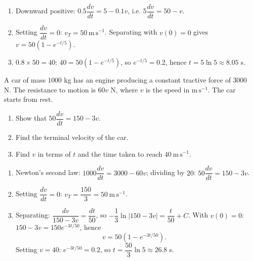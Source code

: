 \documentclass[11pt]{article}
\begin{document}
\begin{corrige}[Exercise 1]
\begin{enumerate}
\item Downward positive: $0.5\dfrac{dv}{dt} = 5 - 0.1v$, i.e. $5\dfrac{dv}{dt} = 50 - v$.
\item Setting $\dfrac{dv}{dt} = 0$: $v_T = 50\ \mathrm{m\,s^{-1}}$. Separating with $v(0) = 0$ gives $v = 50\left(1 - e^{-t/5}\right)$.
\item $0.8 \times 50 = 40$: $40 = 50(1 - e^{-t/5})$, so $e^{-t/5} = 0.2$, hence $t = 5\ln 5 \approx 8.05$ s.
\end{enumerate}
\end{corrige}

\begin{exercice}[]
A car of mass $1000$ kg has an engine producing a constant tractive force of $3000$ N. The resistance to motion is $60v$ N, where $v$ is the speed in $\mathrm{m\,s^{-1}}$. The car starts from rest.
\begin{enumerate}
\item Show that $50\dfrac{dv}{dt} = 150 - 3v$.
\item Find the terminal velocity of the car.
\item Find $v$ in terms of $t$ and the time taken to reach $40\ \mathrm{m\,s^{-1}}$.
\end{enumerate}
\end{exercice}

\begin{corrige}[Exercise 2]
\begin{enumerate}
\item Newton's second law: $1000\dfrac{dv}{dt} = 3000 - 60v$; dividing by $20$: $50\dfrac{dv}{dt} = 150 - 3v$.
\item Setting $\dfrac{dv}{dt} = 0$: $v_T = \dfrac{150}{3} = 50\ \mathrm{m\,s^{-1}}$.
\item Separating: $\dfrac{dv}{150 - 3v} = \dfrac{dt}{50}$, so $-\dfrac{1}{3}\ln|150 - 3v| = \dfrac{t}{50} + C$. With $v(0) = 0$: $150 - 3v = 150e^{-3t/50}$, hence
\[
v = 50\left(1 - e^{-3t/50}\right).
\]
Setting $v = 40$: $e^{-3t/50} = 0.2$, so $t = \dfrac{50}{3}\ln 5 \approx 26.8$ s.
\end{enumerate}
\end{corrige}
\end{document}
